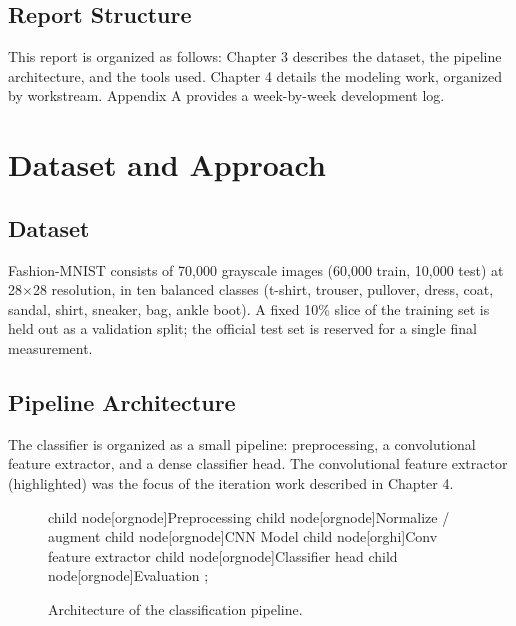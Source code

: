 \documentclass[11pt,a4paper]{report}
\begin{document}
\section{Report Structure}
This report is organized as follows: Chapter 3 describes the dataset, the
pipeline architecture, and the tools used. Chapter 4 details the modeling
work, organized by workstream. Appendix A provides a week-by-week
development log.

\chapter{Dataset and Approach}

\section{Dataset}
Fashion-MNIST consists of 70{,}000 grayscale images (60{,}000 train,
10{,}000 test) at 28$\times$28 resolution, in ten balanced classes
(t-shirt, trouser, pullover, dress, coat, sandal, shirt, sneaker, bag,
ankle boot). A fixed 10\% slice of the training set is held out as a
validation split; the official test set is reserved for a single final
measurement.

\section{Pipeline Architecture}
The classifier is organized as a small pipeline: preprocessing, a
convolutional feature extractor, and a dense classifier head. The
convolutional feature extractor (highlighted) was the focus of the
iteration work described in Chapter 4.

\begin{figure}[h]
\centering
\begin{utadorgchart}
  child { node[orgnode]{Preprocessing}
    child { node[orgnode]{Normalize / augment} } }
  child { node[orgnode]{CNN Model}
    child { node[orghi]{Conv feature extractor} }
    child { node[orgnode]{Classifier head} } }
  child { node[orgnode]{Evaluation} };
\end{utadorgchart}
\caption{Architecture of the classification pipeline.}
\end{figure}
\end{document}
